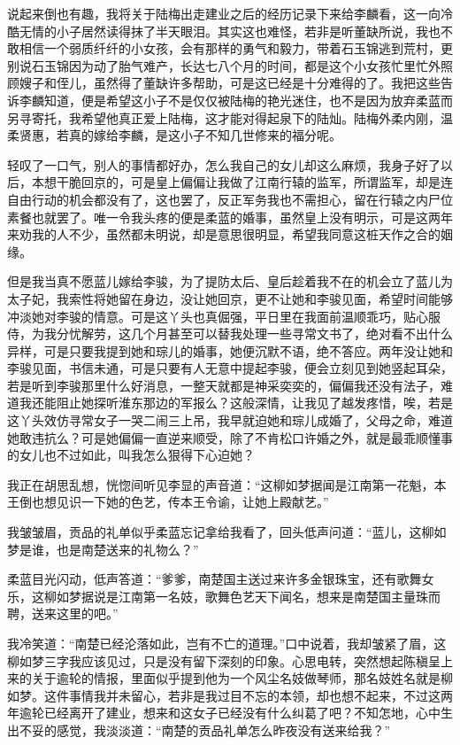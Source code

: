 说起来倒也有趣，我将关于陆梅出走建业之后的经历记录下来给李麟看，这一向冷酷无情的小子居然读得抹了半天眼泪。其实这也难怪，若非是听董缺所说，我也不敢相信一个弱质纤纤的小女孩，会有那样的勇气和毅力，带着石玉锦逃到荒村，更别说石玉锦因为动了胎气难产，长达七八个月的时间，都是这个小女孩忙里忙外照顾嫂子和侄儿，虽然得了董缺许多帮助，可是这已经是十分难得的了。我把这些告诉李麟知道，便是希望这小子不是仅仅被陆梅的艳光迷住，也不是因为放弃柔蓝而另寻寄托，我希望他真正爱上陆梅，这才能对得起泉下的陆灿。陆梅外柔内刚，温柔贤惠，若真的嫁给李麟，是这小子不知几世修来的福分呢。

轻叹了一口气，别人的事情都好办，怎么我自己的女儿却这么麻烦，我身子好了以后，本想干脆回京的，可是皇上偏偏让我做了江南行辕的监军，所谓监军，却是连自由行动的机会都没有了，这也罢了，反正军务我也不需担心，留在行辕之内尸位素餐也就罢了。唯一令我头疼的便是柔蓝的婚事，虽然皇上没有明示，可是这两年来劝我的人不少，虽然都未明说，却是意思很明显，希望我同意这桩天作之合的姻缘。

但是我当真不愿蓝儿嫁给李骏，为了提防太后、皇后趁着我不在的机会立了蓝儿为太子妃，我索性将她留在身边，没让她回京，更不让她和李骏见面，希望时间能够冲淡她对李骏的情意。可是这丫头也真倔强，平日里在我面前温顺乖巧，贴心服侍，为我分忧解劳，这几个月甚至可以替我处理一些寻常文书了，绝对看不出什么异样，可是只要我提到她和琮儿的婚事，她便沉默不语，绝不答应。两年没让她和李骏见面，书信未通，可是只要有人无意中提起李骏，便会立刻见到她竖起耳朵，若是听到李骏那里什么好消息，一整天就都是神采奕奕的，偏偏我还没有法子，难道我还能阻止她探听淮东那边的军报么？这般深情，让我见了越发疼惜，唉，若是这丫头效仿寻常女子一哭二闹三上吊，我早就迫她和琮儿成婚了，父母之命，难道她敢违抗么？可是她偏偏一直逆来顺受，除了不肯松口许婚之外，就是最乖顺懂事的女儿也不过如此，叫我怎么狠得下心迫她？

我正在胡思乱想，恍惚间听见李显的声音道：“这柳如梦据闻是江南第一花魁，本王倒也想见识一下她的色艺，传本王令谕，让她上殿献艺。”

我皱皱眉，贡品的礼单似乎柔蓝忘记拿给我看了，回头低声问道：“蓝儿，这柳如梦是谁，也是南楚送来的礼物么？”

柔蓝目光闪动，低声答道：“爹爹，南楚国主送过来许多金银珠宝，还有歌舞女乐，这柳如梦据说是江南第一名妓，歌舞色艺天下闻名，想来是南楚国主量珠而聘，送来这里的吧。”

我冷笑道：“南楚已经沦落如此，岂有不亡的道理。”口中说着，我却皱紧了眉，这柳如梦三字我应该见过，只是没有留下深刻的印象。心思电转，突然想起陈稹呈上来的关于逾轮的情报，里面似乎提到他为一个风尘名妓做琴师，那名妓姓名就是柳如梦。这件事情我并未留心，若非是我过目不忘的本领，却也想不起来，不过这两年逾轮已经离开了建业，想来和这女子已经没有什么纠葛了吧？不知怎地，心中生出不妥的感觉，我淡淡道：“南楚的贡品礼单怎么昨夜没有送来给我？”

